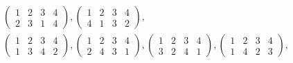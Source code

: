 \documentclass[14pt,a4paper]{scrartcl}
\begin{document}
\begin{spacing}{1}
\begin{gather*}
	\begin{pmatrix}
	1 & 2 & 3 & 4 \\
	2 & 3 & 1 & 4
	\end{pmatrix},
	\begin{pmatrix}
	1 & 2 & 3 & 4 \\
	4 & 1 & 3 & 2
	\end{pmatrix}, \\
	\begin{pmatrix}
	1 & 2 & 3 & 4 \\
	1 & 3 & 4 & 2
	\end{pmatrix},
	\begin{pmatrix}
	1 & 2 & 3 & 4 \\
	2 & 4 & 3 & 1
	\end{pmatrix},
	\begin{pmatrix}
	1 & 2 & 3 & 4 \\
	3 & 2 & 4 & 1
	\end{pmatrix},
	\begin{pmatrix}
	1 & 2 & 3 & 4 \\
	1 & 4 & 2 & 3
	\end{pmatrix},	
	\end{gather*}
	
\end{spacing}
\end{document}
